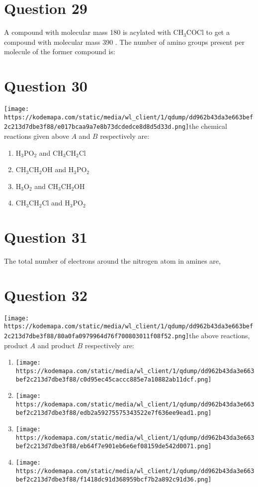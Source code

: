 \documentclass{article}
\begin{document}
\section*{Question 29}
A compound with molecular mass 180 is acylated with \(\mathrm{CH}_3 \mathrm{COCl}\) to get a compound with molecular mass 390 . The number of amino groups present per molecule of the former compound is: 
\begin{enumerate}[label=(\alph*)]
\end{enumerate}
\newpage
\section*{Question 30}
\texttt{[image: https://kodemapa.com/static/media/wl\_client/1/qdump/dd962b43da3e663bef2c213d7dbe3f88/e017bcaa9a7e8b73dcdedce8d8d5d33d.png]}\newlineIn the chemical reactions given above \(A\) and \(B\) respectively are: 
\begin{enumerate}[label=(\alph*)]
\item \(\mathrm{H}_3 \mathrm{PO}_2\) and \(\mathrm{CH}_3 \mathrm{CH}_2 \mathrm{Cl}\)
\item \(\mathrm{CH}_3 \mathrm{CH}_2 \mathrm{OH}\) and \(\mathrm{H}_3 \mathrm{PO}_2\)
\item \(\mathrm{H}_3 \mathrm{O}_2\) and \(\mathrm{CH}_3 \mathrm{CH}_2 \mathrm{OH}\)
\item \(\mathrm{CH}_3 \mathrm{CH}_2 \mathrm{Cl}\) and \(\mathrm{H}_3 \mathrm{PO}_2\)
\end{enumerate}
\newpage
\section*{Question 31}
The total number of electrons around the nitrogen atom in amines are, 
\begin{enumerate}[label=(\alph*)]
\end{enumerate}
\newpage
\section*{Question 32}
\texttt{[image: https://kodemapa.com/static/media/wl\_client/1/qdump/dd962b43da3e663bef2c213d7dbe3f88/80a0fa0979964d76f700803011f08f52.png]}\newlineIn the above reactions, product \(A\) and product \(B\) respectively are:
\begin{enumerate}[label=(\alph*)]
\item \texttt{[image: https://kodemapa.com/static/media/wl\_client/1/qdump/dd962b43da3e663bef2c213d7dbe3f88/c0d95ec45caccc885e7a10882ab11dcf.png]}
\item \texttt{[image: https://kodemapa.com/static/media/wl\_client/1/qdump/dd962b43da3e663bef2c213d7dbe3f88/edb2a59275575343522e7f636ee9ead1.png]}
\item \texttt{[image: https://kodemapa.com/static/media/wl\_client/1/qdump/dd962b43da3e663bef2c213d7dbe3f88/eb64f7e901eb6e6ef08159de542d0071.png]}
\item \texttt{[image: https://kodemapa.com/static/media/wl\_client/1/qdump/dd962b43da3e663bef2c213d7dbe3f88/f1418dc91d368959bcf7b2a892c91d36.png]}
\end{enumerate}
\newpage
\end{document}
